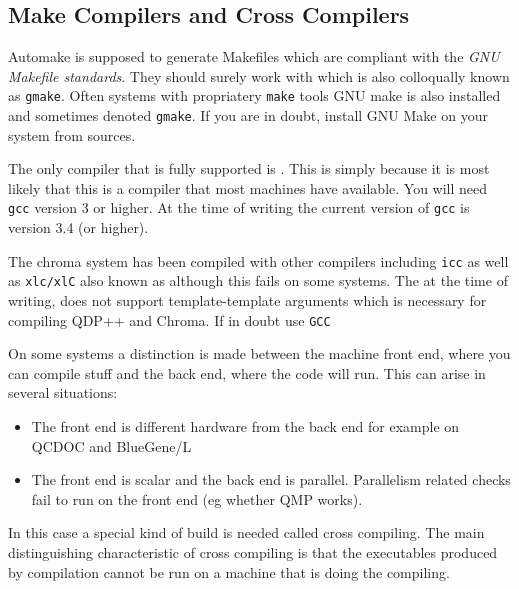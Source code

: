 \documentclass{article}
\begin{document}
\subsection{Make Compilers and Cross Compilers}

Automake is supposed to generate Makefiles which are compliant with the {\em
GNU Makefile standards}. They should surely work with  which is also colloqually known as {\tt gmake}. Often systems with propriatery {\tt make} tools GNU make is also installed  and sometimes denoted {\tt gmake}. If you are in doubt, install GNU Make on your system from sources.

The only compiler that is fully supported is . This is simply because it is most likely that this is a compiler that most machines have available. You will need {\tt gcc} version 3 or higher. At the time of writing the current version of {\tt gcc} is version 3.4 (or higher).

The chroma system has been compiled with other compilers including {\tt icc}  as well as {\tt xlc/xlC} also known as  although this fails on some systems. The  at the time of writing, does not support template-template arguments which is necessary for compiling QDP++ and Chroma. If in doubt use {\tt GCC} 

On some systems a distinction is made between the machine front end, where you can compile stuff and the back end, where the code will run. This can arise in several situations:
\begin{itemize}
\item
The front end is different hardware from the back end for example on QCDOC and BlueGene/L
\item
The front end is scalar and the back end is parallel. Parallelism related checks fail to run on the front end (eg whether QMP works).
\end{itemize}

In this case a special kind of build is needed called cross compiling. The main distinguishing characteristic of cross compiling is that the executables produced by compilation cannot be run on a machine that is doing the compiling.
\end{document}

